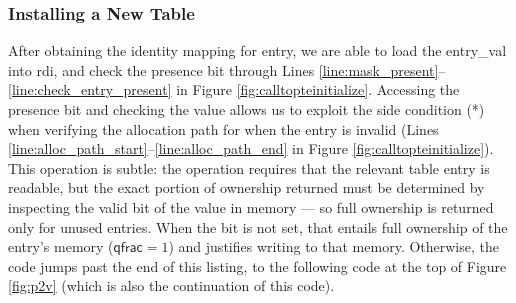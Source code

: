  \subsubsection{Installing a New Table}
 After obtaining the identity mapping for \textsf{entry}, we are able to load the \textsf{entry\_val} into \textsf{rdi}, and check the presence bit through
Lines \ref{line:mask_present}--\ref{line:check_entry_present} in Figure \ref{fig:calltopteinitialize}.
Accessing the presence bit and checking the value allows us to exploit the side condition (*) when verifying the allocation
path for when the entry is invalid (Lines \ref{line:alloc_path_start}--\ref{line:alloc_path_end} in Figure \ref{fig:calltopteinitialize}).
This operation is subtle: the operation requires that the relevant table entry is readable, but the exact portion of ownership 
returned must be determined by inspecting the valid bit of the value in memory --- so full ownership is returned only for unused entries.
When the bit is not set, that entails full ownership of the entry's memory ($\textsf{qfrac} = 1$) and justifies writing to that memory.
Otherwise, the code jumps past the end of this listing, to the following code at the top of Figure \ref{fig:p2v} (which is also the
continuation of this code).

